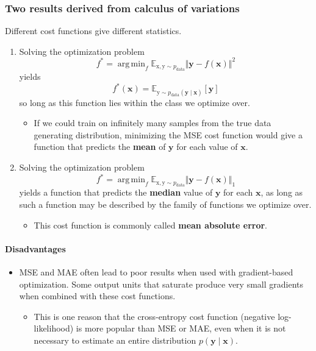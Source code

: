 \documentclass[12pt, a4paper]{article}
\def\vx{\boldsymbol{x}}
\def\vy{\boldsymbol{y}}
\def\vrmx{\boldsymbol{\mathrm{x}}}
\def\vrmy{\boldsymbol{\mathrm{y}}}
\DeclareMathOperator*{\argmin}{arg\,min}
\begin{document}
\subsubsection{Two results derived from calculus of variations} Different cost functions give different statistics.
\begin{enumerate}
    \item Solving the optimization problem 
        \[
            f^* = \argmin_f \mathbb{E}_{\vrmx,\vrmy\sim p_\text{data}} \Vert \vy - f(\vx) \Vert^2
        \]
        yields
        \[
            f^*(\vx) = \mathbb{E}_{\vrmy\sim p_\text{data}(\vy\mid\vx)} [\vy]
        \]
        so long as this function lies within the class we optimize over.
        \begin{itemize}
            \item If we could train on infinitely many samples from the true data generating distribution, minimizing the MSE cost function would give a function that predicts the \textbf{mean} of $\vy$ for each value of $\vx$.
        \end{itemize}
    \item Solving the optimization problem
        \[
            f^* = \argmin_f \mathbb{E}_{\vrmx,\vrmy\sim p_\text{data}} \Vert \vy - f(\vx) \Vert_1
        \]
        yields a function that predicts the \textbf{median} value of $\vy$ for each $\vx$, as long as such a function may be described by the family of functions we optimize over.
        \begin{itemize}
            \item This cost function is commonly called \textbf{mean absolute error}.
        \end{itemize}
\end{enumerate}
\paragraph{Disadvantages}
\begin{itemize}
    \item MSE and MAE often lead to poor results when used with gradient-based optimization. Some output units that saturate produce very small gradients when combined with these cost functions.
    \begin{itemize}
        \item This is one reason that the cross-entropy cost function (negative log-likelihood) is more popular than MSE or MAE, even when it is not necessary to estimate an entire distribution $p(\vy \mid \vx)$.
    \end{itemize}
\end{itemize}
\end{document}
